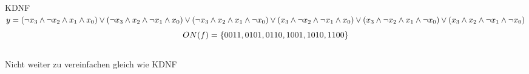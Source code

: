 \documentclass[11pt,a4paper]{article}
\begin{document}
KDNF \\
$\label{KDNF:KDNF}
y=(\neg x_3 \wedge \neg x_2 \wedge x_1 \wedge x_0)\vee ( \neg x_3 \wedge x_2 \wedge \neg x_1 \wedge  x_0) \vee ( \neg x_3 \wedge x_2 \wedge x_1 \wedge \neg x_0) \vee \\ ( x_3 \wedge \neg x_2 \wedge \neg x_1 \wedge x_0) \vee (x_3 \wedge \neg x_2 \wedge x_1 \wedge \neg x_0) \vee ( x_3 \wedge x_2 \wedge \neg x_1 \wedge \neg x_0) $\\
\begin{displaymath}
ON(f)=\lbrace0011,0101,0110,1001,1010,1100\rbrace\\
\end{displaymath}
\\
Nicht weiter zu vereinfachen gleich wie KDNF\\
\end{document}
